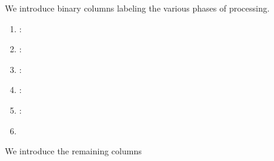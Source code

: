 We introduce binary columns labeling the various phases of processing.
\begin{multicols}{2}
	\begin{enumerate}
		\item \rlpAuthUtilsColumnIsMagic{}:
		\item \rlpAuthUtilsColumnIsPrefix{}:
		\item \rlpAuthUtilsColumnIsChainId{}:
		\item \rlpAuthUtilsColumnIsAddress{}:
		\item \rlpAuthUtilsColumnIsNonce{}:
		\item[\vspace{\fill}]
	\end{enumerate}
\end{multicols}
We introduce the remaining columns
